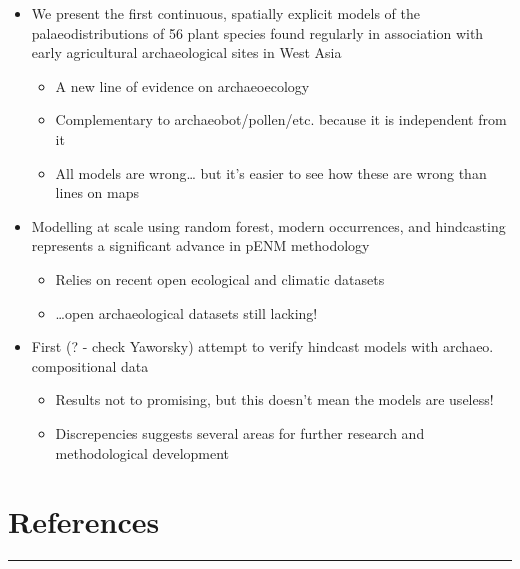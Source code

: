 \documentclass[
  authoryear,
  review]{elsarticle}
\providecommand{\tightlist}{%
  \setlength{\itemsep}{0pt}\setlength{\parskip}{0pt}}\usepackage{longtable,booktabs,array}
\begin{document}
\begin{itemize}
\tightlist
\item
  We present the first continuous, spatially explicit models of the
  palaeodistributions of 56 plant species found regularly in association
  with early agricultural archaeological sites in West Asia

  \begin{itemize}
  \tightlist
  \item
    A new line of evidence on archaeoecology
  \item
    Complementary to archaeobot/pollen/etc. because it is independent
    from it
  \item
    All models are wrong\ldots{} but it's easier to see how these are
    wrong than lines on maps
  \end{itemize}
\item
  Modelling at scale using random forest, modern occurrences, and
  hindcasting represents a significant advance in pENM methodology

  \begin{itemize}
  \tightlist
  \item
    Relies on recent open ecological and climatic datasets
  \item
    \ldots open archaeological datasets still lacking!
  \end{itemize}
\item
  First (? - check Yaworsky) attempt to verify hindcast models with
  archaeo. compositional data

  \begin{itemize}
  \tightlist
  \item
    Results not to promising, but this doesn't mean the models are
    useless!
  \item
    Discrepencies suggests several areas for further research and
    methodological development
  \end{itemize}
\end{itemize}

\section{References}\label{references}

\begin{center}\rule{0.5\linewidth}{0.5pt}\end{center}


  
\end{document}
